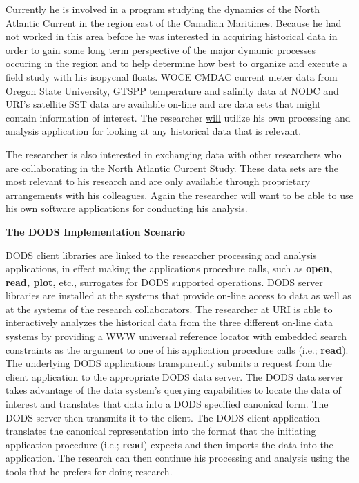 Currently he is involved in a program studying the dynamics of the North
Atlantic Current in the region east of the Canadian Maritimes.  Because he
had not worked in this area before he was interested in acquiring historical
data in order to gain some long term perspective of the major dynamic
processes occuring in the region and to help determine how best to organize
and execute a field study with his isopycnal floats.  WOCE CMDAC current
meter data from Oregon State University, GTSPP temperature and salinity data
at NODC and URI's satellite SST data are available on-line and are data sets
that might contain information of interest.  The researcher \underline{will}
utilize his own processing and analysis application for looking at any
historical data that is relevant.

The researcher is also interested in exchanging data with other researchers
who are collaborating in the North Atlantic Current Study.  These data sets
are the most relevant to his research and are only available through
proprietary arrangements with his colleagues.  Again the researcher will want
to be able to use his own software applications for conducting his analysis.

\medskip \centerline{\bf The DODS Implementation Scenario}

DODS client libraries are linked to the researcher processing and analysis
applications, in effect making the applications procedure calls, such as {\bf
  open, read, plot,} etc., surrogates for DODS supported operations.  DODS
server libraries are installed at the systems that provide on-line access to
data as well as at the systems of the research collaborators.  The researcher
at URI is able to interactively analyzes the historical data from the three
different on-line data systems by providing a WWW universal reference locator
with embedded search constraints as the argument to one of his application
procedure calls (i.e.; {\bf read}).  The underlying DODS applications
transparently submits a request from the client application to the
appropriate DODS data server.  The DODS data server takes advantage of the
data system's querying capabilities to locate the data of interest and
translates that data into a DODS specified canonical form.  The DODS server
then transmits it to the client.  The DODS client application translates the
canonical representation into the format that the initiating application
procedure (i.e.; {\bf read}) expects and then imports the data into the
application.  The research can then continue his processing and analysis
using the tools that he prefers for doing research.

